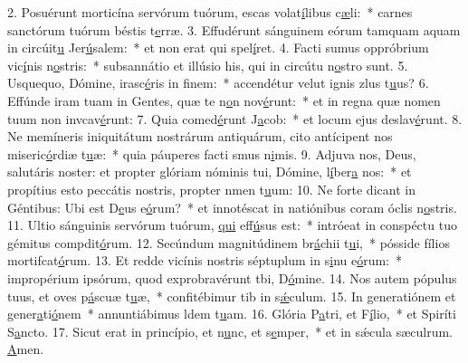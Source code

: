 2. Posuérunt morticína servórum tuórum, escas volat\uline{í}libus c\uline{æ}li:~* carnes sanctórum tuórum béstis t\uline{e}rræ.
3. Effudérunt sánguinem eórum tamquam aquam in circúit\uline{u} Jer\uline{ú}salem:~* et non erat qui spel\uline{í}ret.
4. Facti sumus oppróbrium vic\uline{í}nis n\uline{o}stris:~* subsannátio et illúsio his, qui in circútu n\uline{o}stro sunt.
5. Usquequo, Dómine, irasc\uline{é}ris in f\uline{i}nem:~* accendétur velut ignis zlus t\uline{u}us?
6. Effúnde iram tuam in Gentes, quæ te n\uline{o}n nov\uline{é}runt:~* et in regna quæ nomen tuum non invcav\uline{é}runt:
7. Quia comed\uline{é}runt J\uline{a}cob:~* et locum ejus deslav\uline{é}runt.
8. Ne memíneris iniquitátum nostrárum antiquárum, cito antícipent nos miseric\uline{ó}rdiæ t\uline{u}æ:~* quia páuperes facti smus n\uline{i}mis.
9. Adjuva nos, Deus, salutáris noster: et propter glóriam nóminis tui, Dómine, l\uline{í}ber\uline{a} nos:~* et propítius esto peccátis nostris, propter nmen t\uline{u}um:
10. Ne forte dicant in Géntibus: Ubi est D\uline{e}us e\uline{ó}rum?~* et innotéscat in natiónibus coram óclis n\uline{o}stris.
11. Ultio sánguinis servórum tuórum, \uline{qui} eff\uline{ú}sus est:~* intróeat in conspéctu tuo gémitus compdit\uline{ó}rum.
12. Secúndum magnitúdinem br\uline{á}chii t\uline{u}i,~* pósside fílios mortifcat\uline{ó}rum.
13. Et redde vicínis nostris séptuplum in s\uline{i}nu e\uline{ó}rum:~* impropérium ipsórum, quod exprobravérunt tbi, D\uline{ó}mine.
14. Nos autem pópulus tuus, et oves p\uline{á}scuæ t\uline{u}æ,~* confitébimur tib in s\uline{ǽ}culum.
15. In generatiónem et gener\uline{a}ti\uline{ó}nem~* annuntiábimus ldem t\uline{u}am.
16. Glória P\uline{a}tri, et F\uline{í}lio,~* et Spiríti S\uline{a}ncto.
17. Sicut erat in princípio, et n\uline{u}nc, et s\uline{e}mper,~* et in sǽcula sæculrum. \uline{A}men.
